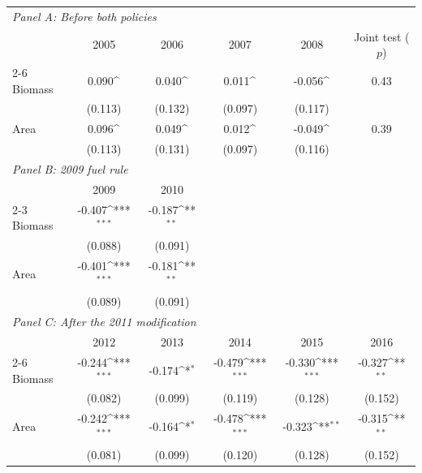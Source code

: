 \def\sym#1{\ifmmode^{#1}\else\(^{#1}\)\fi}
\begin{tabular}{l*{5}{c}}
\hline\hline
\multicolumn{6}{l}{\emph{Panel A: Before both policies}}\\[0.3em]
 & 2005 & 2006 & 2007 & 2008 & Joint test ($p$)\\
\cmidrule(lr){2-6}
Biomass & 0.090\sym{} & 0.040\sym{} & 0.011\sym{} & -0.056\sym{} & 0.43\\
 & (0.113) & (0.132) & (0.097) & (0.117) & \\
Area & 0.096\sym{} & 0.049\sym{} & 0.012\sym{} & -0.049\sym{} & 0.39\\
 & (0.113) & (0.131) & (0.097) & (0.116) & \\
[0.6em]
\multicolumn{6}{l}{\emph{Panel B: 2009 fuel rule}}\\[0.3em]
 & 2009 & 2010 &  &  & \\
\cmidrule(lr){2-3}
Biomass & -0.407\sym{***} & -0.187\sym{**} &  &  & \\
 & (0.088) & (0.091) &  &  & \\
Area & -0.401\sym{***} & -0.181\sym{**} &  &  & \\
 & (0.089) & (0.091) &  &  & \\
[0.6em]
\multicolumn{6}{l}{\emph{Panel C: After the 2011 modification}}\\[0.3em]
 & 2012 & 2013 & 2014 & 2015 & 2016\\
\cmidrule(lr){2-6}
Biomass & -0.244\sym{***} & -0.174\sym{*} & -0.479\sym{***} & -0.330\sym{***} & -0.327\sym{**}\\
 & (0.082) & (0.099) & (0.119) & (0.128) & (0.152)\\
Area & -0.242\sym{***} & -0.164\sym{*} & -0.478\sym{***} & -0.323\sym{**} & -0.315\sym{**}\\
 & (0.081) & (0.099) & (0.120) & (0.128) & (0.152)\\
\hline\hline
\end{tabular}
